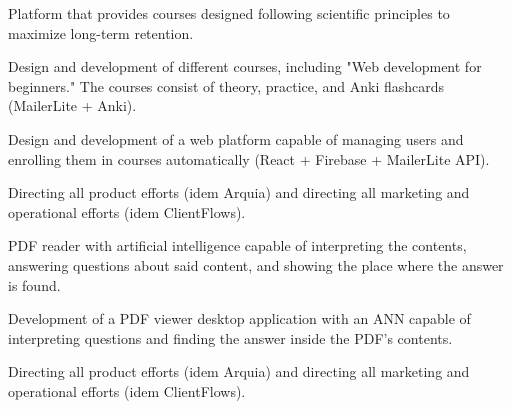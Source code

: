\documentclass[]{robertino-cv}
\begin{document}
\begin{minipage}[t]{0.50\textwidth}
Platform that provides courses designed following scientific principles to maximize long-term retention.
\begin{tightemize}
\item Design and development of different courses, including "Web development for beginners." The courses consist of theory, practice, and Anki flashcards (MailerLite + Anki).
\item Design and development of a web platform capable of managing users and enrolling them in courses automatically (React + Firebase + MailerLite API).
\item Directing all product efforts (idem Arquia) and directing all marketing and operational efforts (idem ClientFlows).
\end{tightemize}
\sectionsep


PDF reader with artificial intelligence capable of interpreting the contents, answering questions about said content, and showing the place where the answer is found.
\begin{tightemize}
\item Development of a PDF viewer desktop application with an ANN capable of interpreting questions and finding the answer inside the PDF's contents.
\item Directing all product efforts (idem Arquia) and directing all marketing and operational efforts (idem ClientFlows).
\end{tightemize}
\sectionsep


\end{minipage} 
\end{document}
